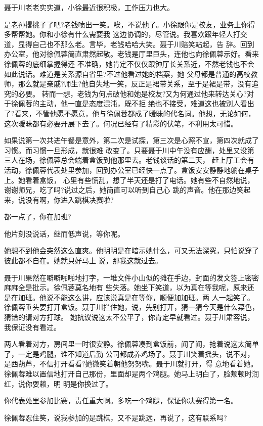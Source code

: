 \documentclass[11pt,a4paper,onecolumn]{article}
\begin{document}
聂于川老老实实道，小徐最近很积极，工作压力也大。

是老孙撂挑子了吧?老钱喷出一笑。唉，不说他了。小徐跟你是校友，业务上你得多帮帮她。你和小徐有什么需要我
这边协调的，尽管说。我喜欢跟年轻人打交道，显得自己也不那么老。言毕，老钱哈哈大笑。聂于川赔笑站起，告
辞。回到办公室，他对徐佩蓉简直肃然起敬。老钱是厅里巨头，连他也向徐佩蓉示好。看来徐佩蓉的底细掌握得还
不准确，她肯定不仅仅跟钟厅长关系近，不然老钱也不会如此说话。难道是关系源自省里?不过他看过她的档案，她
父母都是普通的高校教师，那么就是亲戚?师生?他自失地一笑，反正是裙带关系，至于是裙是带，没有追究的必要。
转而一想，老钱为何点破他和她是校友?又为何通过他来转达关心?对于徐佩蓉的主动，他一直是态度混沌，既不拒
绝也不接受，难道这也被别人看出了?看来，不管他愿不愿意，他与徐佩蓉都成了暧昧的代名词。他想，无论如何，
这次暧昧都有必要开展下去了。何况已经有了精彩的伏笔，不利用太可惜。

如果说第一次共进午餐是意外，第二次是试探，第三次是心照不宣，第四次就成了习惯。而习惯一旦形成，就很难
改变了。只要聂于川中午没有应酬，处里又没第三人在场，徐佩蓉总会端着盒饭到他那里去。老钱谈话的第二天，
赶上厅工会有活动，徐佩蓉代表处里参加，回到办公室已经快一点了。盒饭安安静静地躺在桌子上。她看着盒饭，
心里有些慌乱，想了半天还是打了电话。她有些不自然地说，谢谢师兄，吃了吗?说过之后，她简直可以听到自己心
跳的声音。他在那边笑起来，说没有啊，你进入跳棋决赛啦?

都一点了，你在加班?

他片刻没说话，继而低声说，等你呢。

她想不到他会突然这么直爽。他明明是在暗示她什么，可又无法深究，只怕说穿了彼此都不自在。她就只好马上
说，那我这就过去。

聂于川果然在噼噼啪啪地打字，一堆文件小山似的摊在手边，封面的发文签上密密麻麻全是批示。徐佩蓉莫名地有
些失落。她坐下笑道，以为真在等我呢，原来还是在加班。他说不能这么讲，应该说真是在等你，顺便加加班。两
人一起笑了。徐佩蓉垂头要打开盒饭。聂于川拦住她，说，先别打开，猜一猜今天是什么菜色，猜错的请对方打球。
她抗议说这太不公平了，你肯定早就看过。聂于川肃容说，我保证没有看过。

两人看着对方，房间里一时很安静。徐佩蓉凑到盒饭前，闻了闻，抢着说这太简单了，一定是鸡腿，谁不知道后勤
公司都成养鸡场了。聂于川笑着摇头，说不对，是西葫芦，不信打开看看?她微笑着朝他努努嘴。聂于川就打开，得
意地看着她。徐佩蓉难以置信地打开自己那份，里面却是两个鸡腿。她马上明白了，脸颊顿时润红，说你耍赖，明
明是你换过了。

你代表处里参加比赛，责任重大啊。多吃一个鸡腿，保证你决赛得第一名。

徐佩蓉忍住笑，说我参加的是跳棋，又不是跳远，再说了，这有联系吗?
\end{document}
